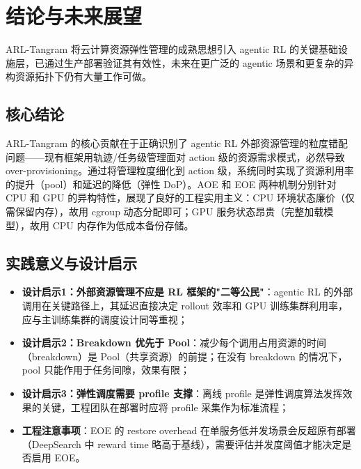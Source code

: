 \documentclass[11pt, a4paper]{article}
\begin{document}
\section{结论与未来展望}

\begin{keyinsight}[TL;DR]
ARL-Tangram 将云计算资源弹性管理的成熟思想引入 agentic RL 的关键基础设施层，已通过生产部署验证其有效性，未来在更广泛的 agentic 场景和更复杂的异构资源拓扑下仍有大量工作可做。
\end{keyinsight}

\subsection{核心结论}

ARL-Tangram 的核心贡献在于正确识别了 agentic RL 外部资源管理的粒度错配问题——现有框架用轨迹/任务级管理面对 action 级的资源需求模式，必然导致 over-provisioning。通过将管理粒度细化到 action 级，系统同时实现了资源利用率的提升（pool）和延迟的降低（弹性 DoP）。AOE 和 EOE 两种机制分别针对 CPU 和 GPU 的异构特性，展现了良好的工程实用主义：CPU 环境状态廉价（仅需保留内存），故用 cgroup 动态分配即可；GPU 服务状态昂贵（完整加载模型），故用 CPU 内存作为低成本备份存储。

\subsection{实践意义与设计启示}

\begin{itemize}
  \item \textbf{设计启示1：外部资源管理不应是 RL 框架的"二等公民"}：agentic RL 的外部调用在关键路径上，其延迟直接决定 rollout 效率和 GPU 训练集群利用率，应与主训练集群的调度设计同等重视；
  \item \textbf{设计启示2：Breakdown 优先于 Pool}：减少每个调用占用资源的时间（breakdown）是 Pool（共享资源）的前提；在没有 breakdown 的情况下，pool 只能作用于任务间隙，效果有限；
  \item \textbf{设计启示3：弹性调度需要 profile 支撑}：离线 profile 是弹性调度算法发挥效果的关键，工程团队在部署时应将 profile 采集作为标准流程；
  \item \textbf{工程注意事项}：EOE 的 restore overhead 在单服务低并发场景会反超原有部署（DeepSearch 中 reward time 略高于基线），需要评估并发度阈值才能决定是否启用 EOE。
\end{itemize}
\end{document}
